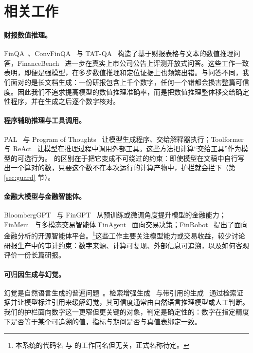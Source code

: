 \section{相关工作}
\label{sec:related}

\paragraph{财报数值推理。}FinQA~\citep{chen2021finqa}、ConvFinQA~\citep{chen2022convfinqa} 与 TAT-QA~\citep{zhu2021tatqa} 构造了基于财报表格与文本的数值推理问答，FinanceBench~\citep{islam2023financebench} 进一步在真实上市公司公告上评测开放式问答。这些工作一致表明，即便是强模型，在多步数值推理和定位证据上也频繁出错。与问答不同，我们面对的是长文档生成：一份研报包含上千个数字，任何一个错都会损害整篇可信度。因此我们不追求提高模型的数值推理准确率，而是把数值推理整体移交给确定性程序，并在生成之后逐个数字核对。

\paragraph{程序辅助推理与工具调用。}PAL~\citep{gao2023pal} 与 Program of Thoughts~\citep{chen2023pot} 让模型生成程序、交给解释器执行；Toolformer~\citep{schick2023toolformer} 与 ReAct~\citep{yao2023react} 让模型在推理过程中调用外部工具。这些方法把计算“交给工具”作为模型的可选行为。\sysname{} 的区别在于把它变成不可绕过的约束：即使模型在文稿中自行写出一个算对的数，只要这个数不在本次运行的计算产物中，护栏就会拦下（第 \ref{sec:guard} 节）。

\paragraph{金融大模型与金融智能体。}BloombergGPT~\citep{wu2023bloomberggpt} 与 FinGPT~\citep{yang2023fingpt} 从预训练或微调角度提升模型的金融能力；FinMem~\citep{yu2023finmem} 与多模态交易智能体 FinAgent~\citep{zhang2024finagent} 面向交易决策；FinRobot~\citep{yang2024finrobot} 提出了面向金融分析的开源智能体平台。\footnote{本系统的代码名 \sysname{} 与 \citet{zhang2024finagent} 的工作同名但无关，正式名称待定。}这些工作主要关注模型能力或交易收益，较少讨论研报生产中的审计约束：数字来源、计算可复现、外部信息可追溯，以及如何客观评价一份长篇研报。

\paragraph{可归因生成与幻觉。}幻觉是自然语言生成的普遍问题~\citep{ji2023survey}。检索增强生成~\citep{lewis2020rag} 与带引用的生成~\citep{gao2023alce} 通过检索证据并让模型标注引用来缓解幻觉，其可信度通常由自然语言推理模型或人工判断。我们的护栏面向数字这一更窄但更关键的对象，判定是确定性的：数字在指定精度下是否等于某个可追溯的值，指标与期间是否与真值表绑定一致。

